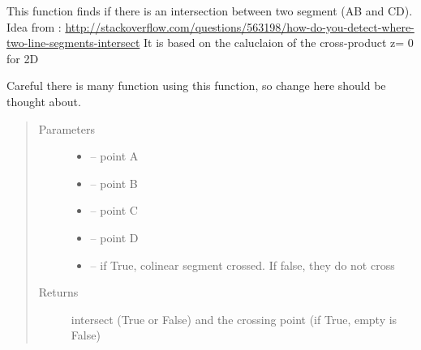 \documentclass[letterpaper,10pt,english]{sphinxmanual}
\begin{document}
\begin{fulllineitems}
\label{\detokenize{index:src.manage_grid_8.intersection_seg}}
This function finds if there is an intersection between two segment (AB and CD). Idea from :
\url{http://stackoverflow.com/questions/563198/how-do-you-detect-where-two-line-segments-intersect}
It is based on the caluclaion of the cross-product z= 0 for 2D

Careful there is many function using this function, so change here should be thought about.
\begin{quote}\begin{description}
\item[{Parameters}] \leavevmode\begin{itemize}
\item {} 
 -- point A

\item {} 
 -- point B

\item {} 
 -- point C

\item {} 
 -- point D

\item {} 
 -- if True, colinear segment crossed. If false, they do not cross

\end{itemize}

\item[{Returns}] \leavevmode
intersect (True or False) and the crossing point (if True, empty is False)

\end{description}\end{quote}

\end{fulllineitems}

\end{document}
